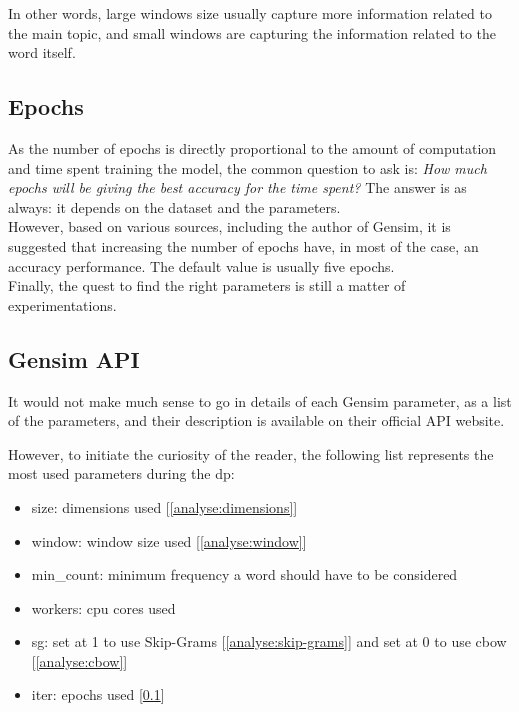 In other words, large windows size usually capture more information related to the main topic, and small windows are capturing the information related to the word itself.


\subsection{Epochs}
\label{analyse:epochs}
As the number of epochs is directly proportional to the amount of computation and time spent training the model, the common question to ask is: \textit{How much epochs will be giving the best accuracy for the time spent?} The answer is as always: it depends on the dataset and the parameters. \\

However, based on various sources, including the author of Gensim\cite{article:word2vec-epochs}, it is suggested that increasing the number of epochs have, in most of the case, an accuracy performance. The default value is usually five epochs.\\

Finally, the quest to find the right parameters is still a matter of experimentations.


\subsection{Gensim API}
It would not make much sense to go in details of each Gensim parameter, as a list of the parameters, and their description is available on their official API website\cite{article:gensim-api}.

However, to initiate the curiosity of the reader, the following list represents the most used parameters during the \gls{dp}:

\begin{itemize}
    \setlength\itemsep{0em}
    \item size: dimensions used [\ref{analyse:dimensions}]
    \item window: window size used [\ref{analyse:window}]
    \item min\_count: minimum frequency a word should have to be considered
    \item workers: cpu cores used
    \item sg: set at 1 to use Skip-Grams [\ref{analyse:skip-grams}] and set at 0 to use \gls{cbow} [\ref{analyse:cbow}]
    \item iter: epochs used [\ref{analyse:epochs}]
\end{itemize}


